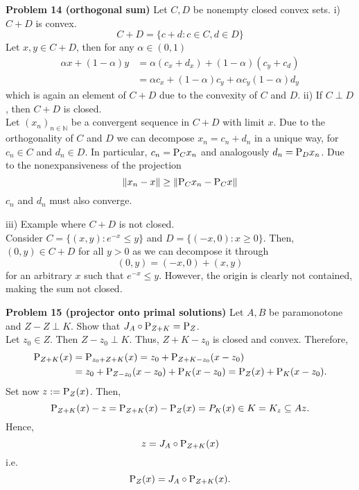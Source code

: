 \documentclass{scrartcl}
\newcommand{\N}{\mathbb{N}}
\newcommand{\sub}{\subseteq}
\theoremstyle{plain}
\theoremstyle{remark}
\renewcommand{\P}{\textup{P}}
\begin{document}
\textbf{Problem 14 (orthogonal sum)} Let $C, D$ be nonempty closed convex sets.
i) $C+D$ is convex.
\begin{equation}
  C+D = \{c+d : c \in C, d \in D\}
\end{equation}
Let $x,y \in C+D$, then for any $\alpha \in (0,1)$
\begin{equation}
  \begin{aligned}
    \alpha x+ (1 -\alpha)y &= \alpha(c_x + d_x) + (1-\alpha)(c_y + c_d)\\
    &= \alpha c_x + (1-\alpha) c_y + \alpha c_y (1-\alpha) d_y
  \end{aligned}
\end{equation}
which is again an element of $C+D$ due to the convexity of $C$ and $D$.
ii) If $C \perp D$, then $C+D$ is closed. \\
Let $(x_{n})_{n \in \N}$ be a convergent sequence in $C+D$ with limit $x$. Due to the orthogonality of $C$ and $D$ we can decompose $x_{n} = c_{n} + d_{n}$ in a unique way, for $c_{n} \in C$ and $d_{n} \in D$. In particular, $c_{n} = \P_{C}x_{n}$ and analogously $d_{n} = \P_{D}x_{n}$. Due to the nonexpansiveness of the projection 
\begin{equation}
  \lVert x_{n} - x \rVert \ge \lVert \P_{C}x_{n} - \P_{C}x \rVert
\end{equation}$c_{n}$ and $d_{n}$ must also converge.

iii) Example where $C+D$ is not closed.\\
Consider $C=\{(x,y) : e^{-x} \le y\}$ and $D = \{(-x,0) : x \ge 0\}$. Then, $(0, y) \in C+D$ for all $y>0$ as we can decompose it through
\begin{equation}
  (0, y) = (-x, 0) + (x, y)
\end{equation}
for an arbitrary $x$ such that $e^{-x} \le y$. However, the origin is clearly not contained, making the sum not closed.

\textbf{Problem 15 (projector onto primal solutions)} Let $A,B$ be paramonotone and $Z-Z \perp K$. Show that $J_A \circ \P_{Z+K} = \P_Z$.\\
Let $z_0 \in Z$. Then $Z-z_0 \perp K$. Thus, $Z+K -z_0$ is closed and convex.
Therefore,
\begin{equation}
  \begin{aligned}
    \P_{Z+K}(x) &= \P_{z_0+ Z+K}(x) = z_0 + \P_{Z+K-z_0}(x-z_0) \\
    &= z_0 + \P_{Z-z_0}(x-z_0) + \P_{K}(x-z_0) = \P_Z(x) + \P_K(x-z_0).
  \end{aligned}
\end{equation}
Set now $z := \P_Z(x)$.
Then,
\begin{equation}
  \P_{Z+K}(x) - z = \P_{Z+K}(x) - \P_Z(x) = P_K(x) \in K = K_z \sub Az.
\end{equation}
Hence,
\begin{equation}
  z = J_A \circ \P_{Z+K}(x)
\end{equation}
i.e.
\begin{equation}
  \P_Z(x) = J_A \circ \P_{Z+K}(x).
\end{equation}
\end{document}
